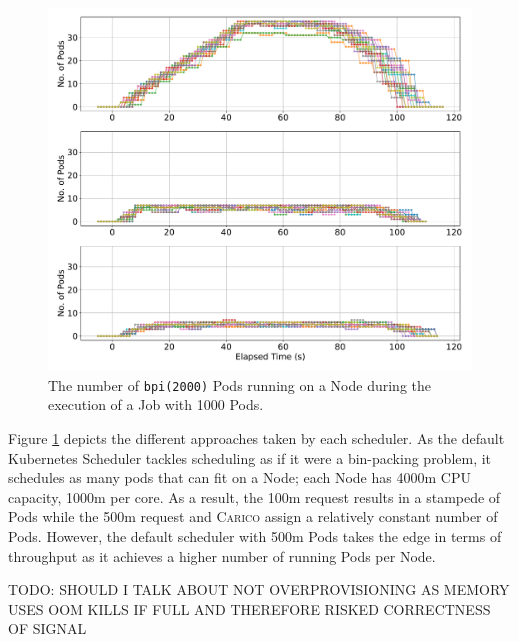 \begin{figure}[ht!]
    \centering
    \includegraphics[width=\textwidth]{images/pi-running-pods.pdf}
    \caption{The number of \texttt{bpi(2000)} Pods running on a Node during the
    execution of a Job with 1000 Pods.}
    \label{fig:pi-2000-1000x-pod-running}
\end{figure}
Figure \ref{fig:pi-2000-1000x-pod-running} depicts the different approaches
taken by each scheduler. As the default Kubernetes Scheduler tackles scheduling
as if it were a bin-packing problem, it schedules as many pods that can fit on a
Node; each Node has 4000m CPU capacity, 1000m per core. As a result, the 100m
request results in a stampede of Pods while the 500m request and \textsc{Carico} assign
a relatively constant number of Pods. However, the default scheduler with 500m
Pods takes the edge in terms of throughput as it achieves a higher number of
running Pods per Node.


TODO: SHOULD I TALK ABOUT NOT OVERPROVISIONING AS MEMORY USES OOM KILLS IF FULL
AND THEREFORE RISKED CORRECTNESS OF SIGNAL

